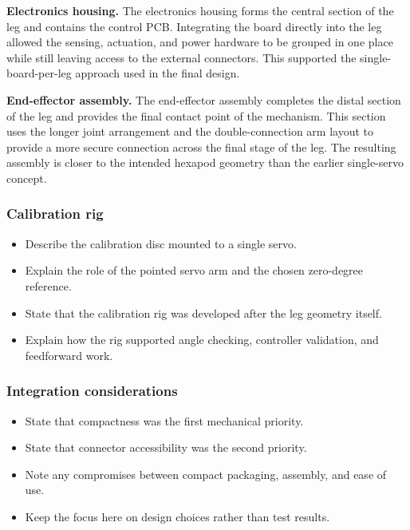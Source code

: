 \noindent\textbf{Electronics housing.} The electronics housing forms the central section of the leg and contains the control PCB. Integrating the board directly into the leg allowed the sensing, actuation, and power hardware to be grouped in one place while still leaving access to the external connectors. This supported the single-board-per-leg approach used in the final design.

\noindent\textbf{End-effector assembly.} The end-effector assembly completes the distal section of the leg and provides the final contact point of the mechanism. This section uses the longer joint arrangement and the double-connection arm layout to provide a more secure connection across the final stage of the leg. The resulting assembly is closer to the intended hexapod geometry than the earlier single-servo concept.

\subsubsection{Calibration rig}
\begin{itemize}[label=\textcolor{red}{\textbullet}, before=\color{red}]
  \item Describe the calibration disc mounted to a single servo.
  \item Explain the role of the pointed servo arm and the chosen zero-degree reference.
  \item State that the calibration rig was developed after the leg geometry itself.
  \item Explain how the rig supported angle checking, controller validation, and feedforward work.
\end{itemize}

\subsubsection{Integration considerations}
\begin{itemize}[label=\textcolor{red}{\textbullet}, before=\color{red}]
  \item State that compactness was the first mechanical priority.
  \item State that connector accessibility was the second priority.
  \item Note any compromises between compact packaging, assembly, and ease of use.
  \item Keep the focus here on design choices rather than test results.
\end{itemize}

